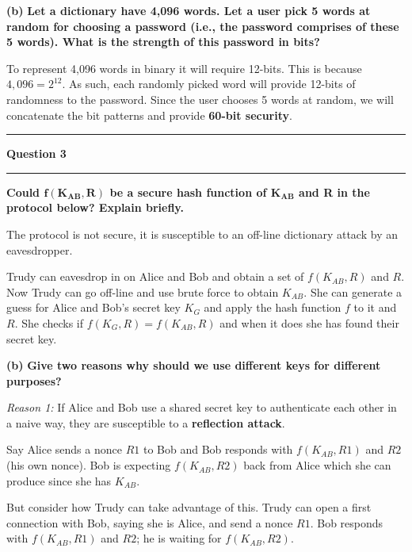 \documentclass[11pt]{article}
\newcommand\question[2]{\vspace{.25in}\hrule\textbf{#1}\vspace{.5em}\hrule\vspace{.10in}}
\renewcommand\part[1]{\vspace{.10in}\textbf{(#1)}}
\begin{document}
\part{b} \textbf{Let a dictionary have 4,096 words. Let a user pick 5 words at random for choosing a password (i.e., the password comprises of these 5 words). What is the strength of this password in bits?}

To represent 4,096 words in binary it will require 12-bits. This is because $4,096 = 2^{12}$. As such, each randomly picked word will provide 12-bits of randomness to the password. Since the user chooses 5 words at random, we will concatenate the bit patterns and provide \textbf{60-bit security}.

\question{Question 3}

\part{a} \textbf{Could $\mathbf{f(K_{AB}, R)}$ be a secure hash function of $\mathbf{K_{AB}}$ and R in the protocol below? Explain briefly.}

The protocol is not secure, it is susceptible to an off-line dictionary attack by an eavesdropper. 

Trudy can eavesdrop in on Alice and Bob and obtain a set of $f(K_{AB}, R)$ and $R$. Now Trudy can go off-line and use brute force to obtain $K_{AB}$. She can generate a guess for Alice and Bob's secret key $K_{G}$ and apply the hash function $f$ to it and $R$. She checks if $f(K_{G}, R) = f(K_{AB}, R)$ and when it does she has found their secret key.

\part{b} \textbf{Give two reasons why should we use different keys for different purposes?}

\textit{Reason 1:} If Alice and Bob use a shared secret key to authenticate each other in a naive way, they are susceptible to a \textbf{reflection attack}. 

Say Alice sends a nonce $R1$ to Bob and Bob responds with $f(K_{AB}, R1)$ and $R2$ (his own nonce). Bob is expecting $f(K_{AB}, R2)$ back from Alice which she can produce since she has $K_{AB}$.

But consider how Trudy can take advantage of this. Trudy can open a first connection with Bob, saying she is Alice, and send a nonce $R1$. Bob responds with $f(K_{AB}, R1)$ and $R2$; he is waiting for $f(K_{AB}, R2)$. 
\end{document}
